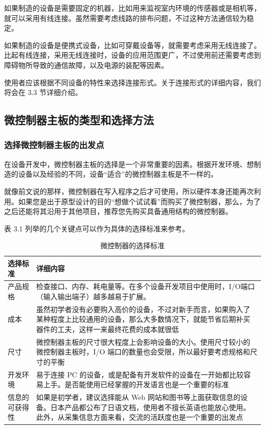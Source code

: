 \documentclass[12pt,UTF8]{ctexbook}
\begin{document}
如果制造的设备是需要固定的机器，比如用来监视室内环境的传感器或是相机等，就可以采用有线连接。虽然需要考虑线路的排布问题，不过这种方法通信较为稳定。

如果制造的设备是便携式设备，比如可穿戴设备等，就需要考虑采用无线连接了。比起有线连接，采用无线连接时，设备的应用范围更广，不过使用前还需要考虑到障碍物所导致的通信故障，以及电源的装配等因素。

使用者应该根据不同设备的特性来选择连接形式。关于连接形式的详细内容，我们将会在 3.3 节详细介绍。

\subsection{微控制器主板的类型和选择方法}

\subsubsection{选择微控制器主板的出发点}

在设备开发中，微控制器主板的选择是一个非常重要的因素。根据开发环境、想制造的设备以及经验的不同，设备“适合”的微控制器主板是不一样的。

就像前文说的那样，微控制器在写入程序之后才可使用，所以硬件本身还能再次利用。如果您是出于原型设计的目的“想做个试试看”而购买了微控制器，那么，为了之后还能将其沿用于其他项目，推荐您先购买具备通用结构的微控制器。

表 3.1 列举的几个关键点可以作为具体的选择标准来参考。

\begin{table}[!ht] 
	\centering
	\caption{微控制器的选择标准}
	\begin{tabular}{|l|l|}
		\hline
		选择标准 & 详细内容 \\
		\hline
		产品规格 & 检查接口、内存、耗电量等。在多个设备开发项目中使用时，I/O端口（输入输出端子）越多越易于扩展。 \\
		\hline
		成本 & 虽然初学者没有必要购入高价的设备，不过对新手而言，如果购入了某种程度上比较通用的设备，那么大多数情况下，就能节省后期补买器件的工夫，这样一来最终花费的成本就很低 \\
		\hline
		尺寸 & 微控制器主板的尺寸很大程度上会影响设备的大小。使用尺寸较小的微控制器主板时，I/O 端口的数量也会受限，所以最好要考虑规格和尺寸的平衡 \\
		\hline
		开发环境 & 易于连接 PC 的设备，或是配备有开发软件的设备在一开始都比较容易上手。是否能使用已经掌握的开发语言也是一个重要的标准 \\
		\hline
		信息的可获得性 & 如果是初学者，建议选择能从 Web 网站和图书等上面获取信息的设备。日本产品都公布了日语文档，使用者不擅长英语也能放心使用。此外，从采集信息方面来看，交流的活跃度也是一个重要的出发点 \\
		\hline
	\end{tabular}
\end{table}
\end{document}
